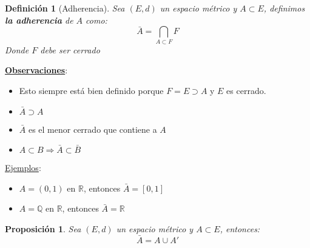 \documentclass[10pt,a4paper,openright]{book}
\theoremstyle{break}
\newtheorem*{defi}{Definición}
\newtheorem*{prop}{Proposición}
\begin{document}
\begin{defi}[Adherencia]
Sea $(E,d)$ un espacio métrico y $A \subset E$, definimos \textbf{la adherencia} de $A$ como:
$$\bar{A} = \bigcap_{A\subset F } F$$
Donde $F$ debe ser cerrado
\end{defi}

\newpage

\underline{\textbf{Observaciones}}:
\begin{itemize}
\item Esto siempre está bien definido porque $F=E\supset A$ y $E$ es cerrado.
\item $\bar{A}\supset A$
\item $\bar{A}$ es el menor cerrado que contiene a $A$
\item $A\subset B\Rightarrow \bar{A}\subset \bar{B}$
\end{itemize}

\underline{Ejemplos}:
\begin{itemize}
\item $A = (0,1)$ en $\mathbb{R}$, entonces $\bar{A} = [0,1]$
\item $A = \mathbb{Q}$ en $\mathbb{R}$, entonces $\bar{A} = \mathbb{R}$
\end{itemize}

\begin{prop}
Sea $(E,d)$ un espacio métrico y $A\subset E$, entonces:
$$\bar{A} = A \cup A'$$
\end{prop}
\end{document}
